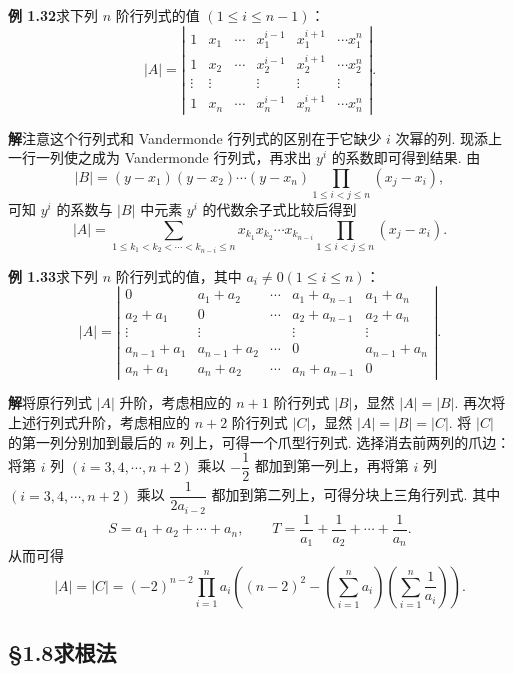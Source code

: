 \documentclass[UTF8, 12pt, fontset=fandol, oneside]{ctexart}
\begin{document}
\noindent\textbf{例 1.32}\quad 求下列 $n$ 阶行列式的值 $(1\le i\le n-1)$：
\[
|A|=\left|\begin{array}{cccccc}
1 & x_1 & \cdots & x_1^{i-1} & x_1^{i+1} & \cdots x_1^n\\
1 & x_2 & \cdots & x_2^{i-1} & x_2^{i+1} & \cdots x_2^n\\
\vdots & \vdots &        & \vdots & \vdots & \vdots\\
1 & x_n & \cdots & x_n^{i-1} & x_n^{i+1} & \cdots x_n^n
\end{array}\right|.
\]

\noindent\textbf{解}\quad 注意这个行列式和 Vandermonde 行列式的区别在于它缺少 $i$ 次幂的列. 现添上一行一列使之成为 Vandermonde 行列式，再求出 $y^i$ 的系数即可得到结果. 由
\[
|B|=(y-x_1)(y-x_2)\cdots(y-x_n)\prod_{1\le i<j\le n}(x_j-x_i),
\]
可知 $y^i$ 的系数与 $|B|$ 中元素 $y^i$ 的代数余子式比较后得到
\[
|A|=\sum_{1\le k_1<k_2<\cdots<k_{n-i}\le n}
x_{k_1}x_{k_2}\cdots x_{k_{n-i}}
\prod_{1\le i<j\le n}(x_j-x_i).
\]

\noindent\textbf{例 1.33}\quad 求下列 $n$ 阶行列式的值，其中 $a_i\ne0(1\le i\le n)$：
\[
|A|=\left|\begin{array}{ccccc}
0 & a_1+a_2 & \cdots & a_1+a_{n-1} & a_1+a_n\\
a_2+a_1 & 0 & \cdots & a_2+a_{n-1} & a_2+a_n\\
\vdots & \vdots &        & \vdots & \vdots\\
a_{n-1}+a_1 & a_{n-1}+a_2 & \cdots & 0 & a_{n-1}+a_n\\
a_n+a_1 & a_n+a_2 & \cdots & a_n+a_{n-1} & 0
\end{array}\right|.
\]

\noindent\textbf{解}\quad 将原行列式 $|A|$ 升阶，考虑相应的 $n+1$ 阶行列式 $|B|$，显然 $|A|=|B|$. 再次将上述行列式升阶，考虑相应的 $n+2$ 阶行列式 $|C|$，显然 $|A|=|B|=|C|$. 将 $|C|$ 的第一列分别加到最后的 $n$ 列上，可得一个爪型行列式. 选择消去前两列的爪边：将第 $i$ 列 $(i=3,4,\cdots,n+2)$ 乘以 $-\dfrac12$ 都加到第一列上，再将第 $i$ 列 $(i=3,4,\cdots,n+2)$ 乘以 $\dfrac1{2a_{i-2}}$ 都加到第二列上，可得分块上三角行列式. 其中
\[
S=a_1+a_2+\cdots+a_n,\qquad T=\frac1{a_1}+\frac1{a_2}+\cdots+\frac1{a_n}.
\]
从而可得
\[
|A|=|C|=(-2)^{n-2}\prod_{i=1}^n a_i
\left((n-2)^2-\left(\sum_{i=1}^n a_i\right)\left(\sum_{i=1}^n\frac1{a_i}\right)\right).
\]

\subsection*{§1.8\quad 求根法}
\end{document}
